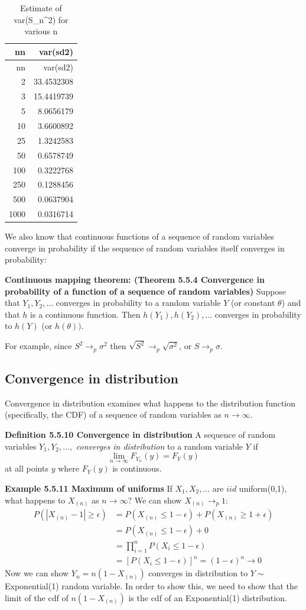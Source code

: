 \documentclass[11pt,]{article}
\begin{document}
\begin{longtable}[]{@{}rr@{}}
\caption{Estimate of var(S\_n\^{}2) for various n}\tabularnewline
\toprule
nn & var(sd2)\tabularnewline
\midrule
\endfirsthead
\toprule
nn & var(sd2)\tabularnewline
\midrule
\endhead
2 & 33.4532308\tabularnewline
3 & 15.4419739\tabularnewline
5 & 8.0656179\tabularnewline
10 & 3.6600892\tabularnewline
25 & 1.3242583\tabularnewline
50 & 0.6578749\tabularnewline
100 & 0.3222768\tabularnewline
250 & 0.1288456\tabularnewline
500 & 0.0637904\tabularnewline
1000 & 0.0316714\tabularnewline
\bottomrule
\end{longtable}

We also know that continuous functions of a sequence of random variables
converge in probability if the sequence of random variables itself
converges in probability:

\noindent\textbf{Continuous mapping theorem: (Theorem 5.5.4 Convergence in probability of a function of a sequence of random variables)}
Suppose that \(Y_1, Y_2, \ldots\) converges in probability to a random
variable \(Y\) (or constant \(\theta\)) and that \(h\) is a continuous
function. Then \(h(Y_1), h(Y_2), \ldots\) converges in probability to
\(h(Y)\) (or \(h(\theta))\).

For example, since \(S^2 \to_p \sigma^2\) then
\(\sqrt{S^2} \to_p \sqrt{\sigma^2}\), or \(S \to_p \sigma\).

\hypertarget{convergence-in-distribution}{%
\subsection{Convergence in
distribution}\label{convergence-in-distribution}}

Convergence in distribution examines what happens to the distribution
function (specifically, the CDF) of a sequence of random variables as
\(n \to \infty\).

\noindent\textbf{Definition 5.5.10 Convergence in distribution} A
sequence of random variables \(Y_1, Y_2, \ldots,\) \emph{converges in
distribution} to a random variable \(Y\) if
\[\lim_{n\to\infty} F_{Y_n}(y) = F_Y(y)\] at all points \(y\) where
\(F_Y(y)\) is continuous.

\textbf{Example 5.5.11 Maximum of uniforms} If \(X_1, X_2, \ldots\) are
\(iid\) uniform(0,1), what happens to \(X_{(n)}\) as \(n\to\infty\)? We
can show \(X_{(n)}\to_p 1\): \begin{align*}
P(|X_{(n)} - 1| \geq \epsilon) &= P(X_{(n)} \leq 1 - \epsilon) + P(X_{(n)} \geq 1 + \epsilon)\\
&= P(X_{(n)} \leq 1 - \epsilon) + 0\\
&= \prod_{i=1}^n P(X_i \leq 1 - \epsilon)\\
&= [P(X_i \leq 1 - \epsilon)]^n = (1-\epsilon)^n \to 0
\end{align*} Now we can show \(Y_n = n(1-X_{(n)})\) converges in
distribution to \(Y \sim\) Exponential(1) random variable. In order to
show this, we need to show that the limit of the cdf of \(n(1-X_{(n)})\)
is the cdf of an Exponential(1) distribution.
\end{document}
